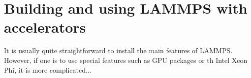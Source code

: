 \chapter{Building and using LAMMPS with accelerators} 
It is usually quite straightforward to install the main features of LAMMPS. However, if one is to use special features such as GPU packages or th Intel Xeon Phi, it is more complicated... 	